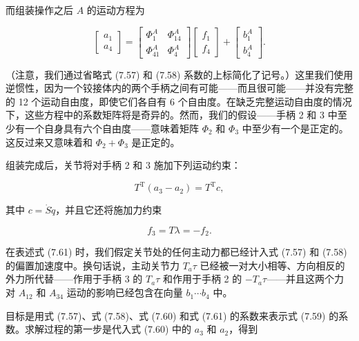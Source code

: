 \documentclass[10pt,a4paper]{book}
\theoremstyle{thmstyle} %
\theoremstyle{defstyle} %
\theoremstyle{prostyle} %
\begin{document}
而组装操作之后 $A$ 的运动方程为



$$
\left[ \begin{array}{l} { a _ { 1 } } \\{ a _ { 4 } } \end{array} \right] = \left[ \begin{array}{ll} { \Phi _ { 1 } ^{A} } & { \Phi _ { 14 } ^{A} } \\{ \Phi _ { 41 } ^{A} } & { \Phi _ { 4 } ^{A} } \end{array} \right] \left[ \begin{array}{l} { f _ { 1 } } \\{ f _ { 4 } } \end{array} \right] + \left[ { \begin{array}{l} { b _ { 1 } ^{A} } \\{ b _ { 4 } ^{A} } \end{array} } \right] .
$$



（注意，我们通过省略式 (7.57) 和 (7.58) 系数的上标简化了记号。）这里我们使用逆惯性，因为一个铰接体内的两个手柄之间有可能——而且很可能——并没有完整的 12 个运动自由度，即使它们各自有 6 个自由度。在缺乏完整运动自由度的情况下，这些方程中的系数矩阵将是奇异的。然而，我们的假设——手柄 2 和 3 中至少有一个自身具有六个自由度——意味着矩阵 $\Phi_{2}$ 和 $\Phi_{3}$ 中至少有一个是正定的。这反过来又意味着和 $\Phi_{2} + \Phi_{3}$ 是正定的。



组装完成后，关节将对手柄 2 和 3 施加下列运动约束：



$$
T ^{\mathrm { T} } ( a _ { 3 } - a _ { 2 } ) = T ^{\mathrm { T} } c ,
$$



其中 $c=\dot{S}\dot{q}$，并且它还将施加力约束



$$
f _ { 3 } = T \lambda = - f _ { 2 } .
$$



在表述式 (7.61) 时，我们假定关节处的任何主动力都已经计入式 (7.57) 和 (7.58) 的偏置加速度中。换句话说，主动关节力 $T_{a}\tau$ 已经被一对大小相等、方向相反的外力所代替——作用于手柄 3 的 $T_{a}\tau$ 和作用于手柄 2 的 $-T_{a}\tau$——并且这两个力对 $A_{12}$ 和 $A_{34}$ 运动的影响已经包含在向量 $b_{1}\cdots b_{4}$ 中。



目标是用式 (7.57)、式 (7.58)、式 (7.60) 和式 (7.61) 的系数来表示式 (7.59) 的系数。求解过程的第一步是代入式 (7.60) 中的 $a_{3}$ 和 $a_{2}$，得到
\end{document}
